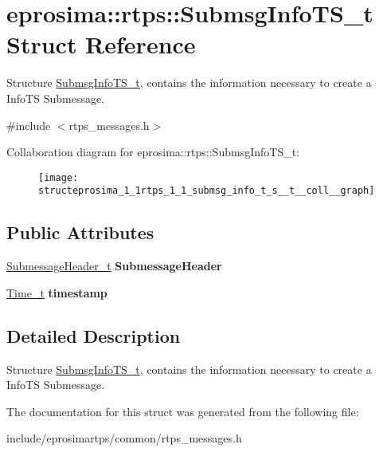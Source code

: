 \hypertarget{structeprosima_1_1rtps_1_1_submsg_info_t_s__t}{\section{eprosima\-:\-:rtps\-:\-:\-Submsg\-Info\-T\-S\-\_\-t \-Struct \-Reference}
\label{structeprosima_1_1rtps_1_1_submsg_info_t_s__t}
}


\-Structure \hyperlink{structeprosima_1_1rtps_1_1_submsg_info_t_s__t}{\-Submsg\-Info\-T\-S\-\_\-t}, contains the information necessary to create a \-Info\-T\-S \-Submessage.  




{\ttfamily \#include $<$rtps\-\_\-messages.\-h$>$}



\-Collaboration diagram for eprosima\-:\-:rtps\-:\-:\-Submsg\-Info\-T\-S\-\_\-t\-:
\nopagebreak
\begin{figure}[H]
\begin{center}
\leavevmode
\texttt{[image: structeprosima\_1\_1rtps\_1\_1\_submsg\_info\_t\_s\_\_t\_\_coll\_\_graph]}
\end{center}
\end{figure}
\subsection*{\-Public \-Attributes}
\begin{DoxyCompactItemize}
\item 
\hypertarget{structeprosima_1_1rtps_1_1_submsg_info_t_s__t_ae7e6aeea26b6640c5682313c3f74565d}{\hyperlink{structeprosima_1_1rtps_1_1_submessage_header__t}{\-Submessage\-Header\-\_\-t} {\bfseries \-Submessage\-Header}}\label{structeprosima_1_1rtps_1_1_submsg_info_t_s__t_ae7e6aeea26b6640c5682313c3f74565d}

\item 
\hypertarget{structeprosima_1_1rtps_1_1_submsg_info_t_s__t_a1b1211242d47e4a44e37bffb16a97628}{\hyperlink{structeprosima_1_1rtps_1_1_time__t}{\-Time\-\_\-t} {\bfseries timestamp}}\label{structeprosima_1_1rtps_1_1_submsg_info_t_s__t_a1b1211242d47e4a44e37bffb16a97628}

\end{DoxyCompactItemize}


\subsection{\-Detailed \-Description}
\-Structure \hyperlink{structeprosima_1_1rtps_1_1_submsg_info_t_s__t}{\-Submsg\-Info\-T\-S\-\_\-t}, contains the information necessary to create a \-Info\-T\-S \-Submessage. 

\-The documentation for this struct was generated from the following file\-:\begin{DoxyCompactItemize}
\item 
include/eprosimartps/common/rtps\-\_\-messages.\-h\end{DoxyCompactItemize}
